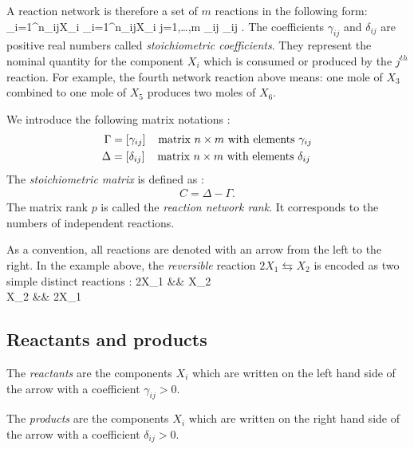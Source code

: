 A reaction network is therefore a set of $m$ reactions in the following form:
\eqnn 
\sum_{i=1}^n\gamma_{ij}X_i \longrightarrow
\sum_{i=1}^n\delta_{ij}X_i  \hspace{5mm} j=1,\ldots,m \hspace{5mm}
\gamma_{ij}  \hspace{5mm} \delta_{ij} .
\eeqnn 
The coefficients $\gamma_{ij}$ and $\delta_{ij}$ are positive real numbers called {\em stoichiometric coefficients}.
They represent the nominal quantity for the component $X_i$ 
which is consumed or produced by the $j^{th}$ reaction.
For example, the fourth network reaction above means: 
one mole of $X_3$ combined to one mole of $X_5$ produces two moles of $X_6$. 

We introduce the following matrix notations :
\begin{equation*} \begin{split}
\Gamma &= [\gamma_{ij}] \hh \hh \mbox{matrix } n \times m \text{ with elements } \gamma_{ij} \\
\Delta &= [\delta_{ij}] \hh \hh \mbox{matrix } n \times m \text{ with elements } \delta_{ij}
\end{split} \end{equation*}
The {\em stoichiometric matrix} is defined as :
\begin{equation*} \begin{split}
C = \Delta - \Gamma.
\end{split} \end{equation*}
The matrix rank $p$ is called the {\em reaction network rank}.
It corresponds to the numbers of independent reactions.

As a convention, all reactions are denoted with an arrow from the left to the right.
In the example above, the {\em reversible} reaction $2X_1 \leftrightarrows X_2$ 
is encoded as two simple distinct reactions : 
\eqnn 
2X_1 &\longrightarrow& X_2 \\ X_2
&\longrightarrow& 2X_1 
\eeqnn

\subsection* {Reactants and products}

The {\em reactants} are the components $X_i$ 
which are written on the left hand side of the arrow with a coefficient $\gamma_{ij} > 0$.

The {\em products} are the components $X_i$ 
which are written on the right hand side of the arrow with a coefficient $\delta_{ij} > 0$. 

